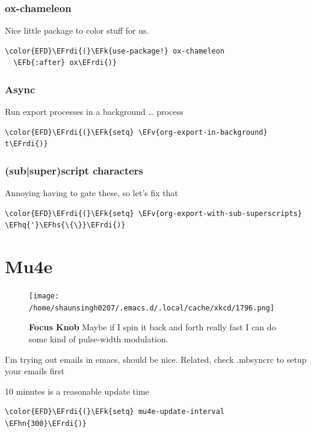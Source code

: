 \documentclass{scrartcl}
\newcommand{\EFk}[1]{\textcolor{EFk}{#1}} %
\newcommand{\EFb}[1]{\textcolor{EFb}{#1}} %
\newcommand{\EFv}[1]{\textcolor{EFv}{#1}} %
\newcommand{\EFhn}[1]{\textcolor{EFhn}{\textbf{#1}}} %
\newcommand{\EFhq}[1]{\textcolor{EFhq}{#1}} %
\newcommand{\EFhs}[1]{\textcolor{EFhs}{#1}} %
\newcommand{\EFrdi}[1]{\textcolor{EFrdi}{#1}} %
\begin{document}
\subsubsection{ox-chameleon}
\label{sec:orga006674}
Nice little package to color stuff for us.
\begin{Code}
\begin{Verbatim}[]
\color{EFD}\EFrdi{(}\EFk{use-package!} ox-chameleon
  \EFb{:after} ox\EFrdi{)}
\end{Verbatim}
\end{Code}

\subsubsection{Async}
\label{sec:org3e75351}
Run export processes in a background \ldots{} process
\begin{Code}
\begin{Verbatim}[]
\color{EFD}\EFrdi{(}\EFk{setq} \EFv{org-export-in-background} t\EFrdi{)}
\end{Verbatim}
\end{Code}

\subsubsection{(sub|super)script characters}
\label{sec:orga00470b}
Annoying having to gate these, so let's fix that
\begin{Code}
\begin{Verbatim}[]
\color{EFD}\EFrdi{(}\EFk{setq} \EFv{org-export-with-sub-superscripts} \EFhq{'}\EFhs{\{\}}\EFrdi{)}
\end{Verbatim}
\end{Code}

\section{Mu4e}
\label{sec:orgbfc91a6}
\begin{figure}[!htb]
	  \centering
	  \texttt{[image: /home/shaunsingh0207/.emacs.d/.local/cache/xkcd/1796.png]}
  \caption*{\label{xkcd:1796} \textbf{Focus Knob} Maybe if I spin it back and forth really fast I can do some kind of pulse-width modulation.}
	\end{figure}
I'm trying out emails in emacs, should be nice. Related, check .mbsyncrc to
setup your emails first

10 minutes is a reasonable update time
\begin{Code}
\begin{Verbatim}[]
\color{EFD}\EFrdi{(}\EFk{setq} mu4e-update-interval \EFhn{300}\EFrdi{)}
\end{Verbatim}
\end{Code}
\end{document}

